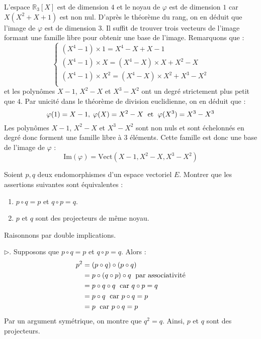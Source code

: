 \documentclass[a4paper,10pt]{report}
\begin{document}
\medskip

\noindent L'espace $\mathbb{R}_3[X]$ est de dimension $4$ et le noyau de $\varphi$ est de dimension $1$ car $X(X^2+X+1)$ est non nul. D'après le théorème du rang, on en déduit que l'image de $\varphi$ est de dimension $3$. Il suffit de trouver trois vecteurs de l'image formant une famille libre pour obtenir une base de l'image. Remarquons que :
$$ \left\lbrace \begin{array}{l}
(X^4-1) \times 1 = X^4-X + X-1 \\
(X^4-1) \times X = (X^4-X) \times X + X^2-X\\
(X^4-1) \times X^2 = (X^4-X) \times X^2 + X^3-X^2\\
\end{array}\right.$$
et les polynômes $X-1$, $X^2-X$ et $X^3-X^2$ ont un degré strictement plus petit que $4$. Par unicité dans le théorème de division euclidienne, on en déduit que :
$$ \varphi(1)= X-1, \; \varphi(X)= X^2-X \; \hbox{ et } \; \varphi(X^3) = X^3-X^3$$
Les polynômes $X-1$, $X^2-X$ et $X^3-X^2$ sont non nuls et sont échelonnés  en degré donc forment une famille libre à $3$ éléments. Cette famille est donc une base de l'image de $\varphi$ :
$$ \textrm{Im}(\varphi) = \textrm{Vect}(X-1,X^2-X,X^3-X^2)$$

\begin{Exercice}{} Soient $p,q$ deux endomorphismes d'un espace vectoriel $E$. Montrer que les assertions suivantes sont équivalentes :
    \begin{enumerate}
\item $p \circ q = p$ et $q \circ p = q$.
\item $p$ et $q$ sont des projecteurs de même noyau.
    \end{enumerate}
\end{Exercice}

\corr Raisonnons par double implications.

\medskip

\noindent $\rhd$. Supposons que $p \circ q = p$ et $q \circ p = q$.  Alors :
\begin{align*}
p^2 & = (p \circ q) \circ (p \circ q) \\
&=p \circ (q \circ p) \circ q \; \hbox{ par associativité} \\
& =p \circ q \circ q  \; \hbox{ car } q \circ p = q\\
&=  p \circ q \; \hbox{ car } p \circ q = p\\
& = p \; \hbox{ car }  p\circ q = p
\end{align*}
Par un argument symétrique, on montre que $q^2=q$. Ainsi, $p$ et $q$ sont des projecteurs.
\end{document}
